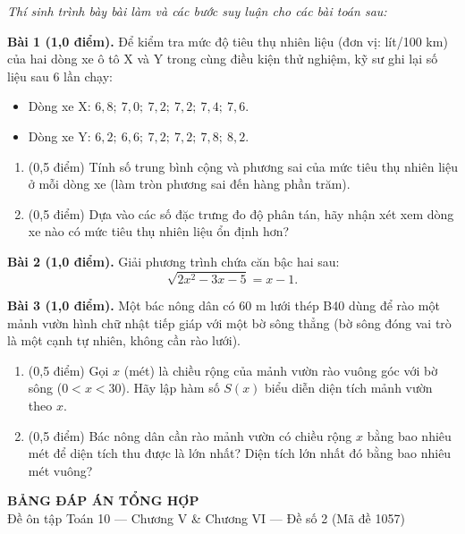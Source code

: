 \documentclass[10pt,a4paper]{article}
\newcommand{\parttitle}[1]{\par\vspace{3.5pt}\needspace{3\baselineskip}{\large\bfseries\color{ink}#1}\par\nopagebreak\vspace{2pt}}
\begin{document}
\vspace{3pt}
\parttitle{PHẦN IV. Tự luận}
\textit{Thí sinh trình bày bài làm và các bước suy luận cho các bài toán sau:}

\vspace{4pt}
\textbf{Bài 1 (1,0 điểm).} Để kiểm tra mức độ tiêu thụ nhiên liệu (đơn vị: lít/100 km) của hai dòng xe ô tô X và Y trong cùng điều kiện thử nghiệm, kỹ sư ghi lại số liệu sau $6$ lần chạy:
\begin{itemize}[leftmargin=1.5em, itemsep=1.5pt]
    \item Dòng xe X: $6{,}8;\ 7{,}0;\ 7{,}2;\ 7{,}2;\ 7{,}4;\ 7{,}6$.
    \item Dòng xe Y: $6{,}2;\ 6{,}6;\ 7{,}2;\ 7{,}2;\ 7{,}8;\ 8{,}2$.
\end{itemize}
\begin{enumerate}[label=\alph*), itemsep=2pt]
    \item (0,5 điểm) Tính số trung bình cộng và phương sai của mức tiêu thụ nhiên liệu ở mỗi dòng xe (làm tròn phương sai đến hàng phần trăm).
    \item (0,5 điểm) Dựa vào các số đặc trưng đo độ phân tán, hãy nhận xét xem dòng xe nào có mức tiêu thụ nhiên liệu ổn định hơn?
\end{enumerate}

\vspace{6pt}
\textbf{Bài 2 (1,0 điểm).} Giải phương trình chứa căn bậc hai sau:
$$\sqrt{2x^2 - 3x - 5} = x - 1.$$

\vspace{6pt}
\textbf{Bài 3 (1,0 điểm).} Một bác nông dân có $60\text{ m}$ lưới thép B40 dùng để rào một mảnh vườn hình chữ nhật tiếp giáp với một bờ sông thẳng (bờ sông đóng vai trò là một cạnh tự nhiên, không cần rào lưới).
\begin{enumerate}[label=\alph*), itemsep=2pt]
    \item (0,5 điểm) Gọi $x$ (mét) là chiều rộng của mảnh vườn rào vuông góc với bờ sông ($0 < x < 30$). Hãy lập hàm số $S(x)$ biểu diễn diện tích mảnh vườn theo $x$.
    \item (0,5 điểm) Bác nông dân cần rào mảnh vườn có chiều rộng $x$ bằng bao nhiêu mét để diện tích thu được là lớn nhất? Diện tích lớn nhất đó bằng bao nhiêu mét vuông?
\end{enumerate}


\newpage
\pagestyle{dapan}
\setcounter{page}{1}

\begin{center}
  {\Large\bfseries\color{ink} BẢNG ĐÁP ÁN TỔNG HỢP}\\[2pt]
  {\small\color{gray!75!black} Đề ôn tập Toán 10 — Chương V \& Chương VI — Đề số 2 (Mã đề 1057)}
\end{center}
\vspace{1pt}
\end{document}
